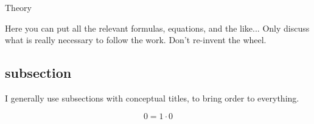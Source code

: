 %
\begin{section}{Theory}\label{sec:Theory}

  Here you can put all the relevant formulas, equations, and the
  like...  Only discuss what is really necessary to follow the
  work. Don't re-invent the wheel.

  \subsection{subsection}\label{sec:subsection}

  I generally use subsections with conceptual titles, to bring order
  to everything.

  \begin{equation}
    \label{eq:template}
    0 = 1 \cdot 0
  \end{equation}

\end{section}
